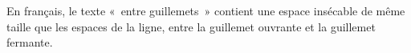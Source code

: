 \documentclass[french]{article}
\begin{document}
En français, le texte «~entre guillemets~» contient une espace
insécable de même taille que les espaces de la ligne, entre la
guillemet ouvrante et la guillemet fermante.
\end{document}
